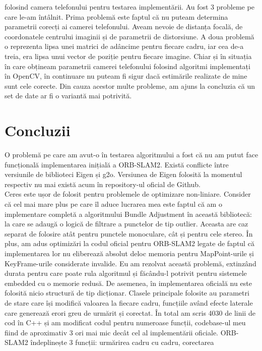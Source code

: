\documentclass[12pt,a4paper]{report}
\begin{document}
folosind camera telefonului pentru testarea implementării. Au fost 3 probleme pe care le-am 
întâlnit. Prima problemă este faptul că nu puteam determina parametrii corecți ai camerei telefonului. Aveam nevoie 
de distanța focală, de coordonatele centrului imaginii și de parametrii de distorsiune.
A doua problemă o reprezenta lipsa unei matrici de adâncime pentru fiecare cadru, iar cea de-a
treia, era lipsa unui vector de poziție pentru fiecare imagine. Chiar 
și în situația în care obțineam parametrii camerei telefonului folosind algoritmi implementați
în OpenCV, în continuare nu puteam fi sigur dacă estimările realizate de mine sunt cele corecte.
Din cauza acestor multe probleme, am ajuns la concluzia că un set de date ar fi o variantă mai potrivită.

\chapter{Concluzii}
O problemă pe care am avut-o în testarea algoritmului a fost că nu am putut face 
funcțională implementarea inițială a ORB-SLAM2. Există conflicte între versiunile de
biblioteci Eigen și g2o. Versiunea de Eigen folosită la momentul respectiv nu mai 
există acum în repository-ul oficial de Github.\\ 
Ceres este ușor de folosit pentru problemele de optimizare non-liniare.
Consider că cel mai mare plus pe care îl aduce lucrarea mea este faptul că am o 
implementare completă a algoritmului Bundle Adjustment în această bibliotecă: la 
care se adaugă o logică de filtrare a punctelor de tip outlier. Aceasta are caz 
separat de folosire atât pentru punctele monoculare, cât și pentru cele stereo.   
În plus, am adus optimizări la codul oficial pentru ORB-SLAM2 legate de faptul că implementarea lor 
nu eliberează absolut deloc memoria pentru MapPoint-urile și KeyFrame-urile 
considerate invalide. Eu am rezolvat această problemă, extinzând durata pentru 
care poate rula algoritmul și făcându-l potrivit pentru sistemele embedded cu o memorie redusă.
De asemenea, în implementarea oficială nu este folosită nicio structură de tip
dicționar. Clasele principale folosite au parametri de stare care își modifică
valoarea la fiecare cadru, funcțiile având efecte laterale care generează erori 
greu de urmărit și corectat. În total am scris 4030 de linii de cod în C++ și 
am modificat codul pentru numeroase funcții, codebase-ul meu fiind de aproximativ 3 ori 
mai mic decât cel al implementării oficiale.  ORB-SLAM2 îndeplinește 3 funcții: urmărirea 
cadru cu cadru, corectarea 
\end{document}
